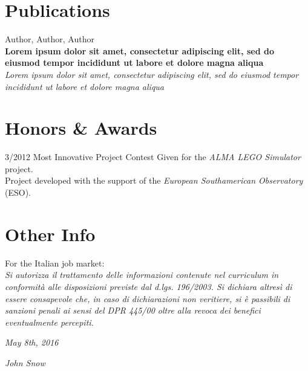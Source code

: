 \documentclass[]{friggeri-cv}
\begin{document}
\section{Publications}
Author, Author, Author\\
\textbf{Lorem ipsum dolor sit amet, consectetur adipiscing elit, sed do eiusmod tempor incididunt ut labore et dolore magna aliqua}\\
\emph{Lorem ipsum dolor sit amet, consectetur adipiscing elit, sed do eiusmod tempor incididunt ut labore et dolore magna aliqua}
\\
\section{Honors \& Awards}
\begin{entrylist}
  \entry
    {3/2012}
    {Most Innovative Project}
    {Contest}
    {Given for the \emph{ALMA LEGO Simulator} project.\\
    Project developed with the support of the \emph{European Southamerican Observatory} (ESO).}
\end{entrylist}

\section{Other Info}
For the Italian job market:\\
\emph{Si autorizza il trattamento delle informazioni contenute nel curriculum in conformità alle disposizioni previste dal d.lgs. 196/2003. Si dichiara altresì di essere consapevole che, in caso di dichiarazioni non veritiere, si è passibili di sanzioni penali ai sensi del DPR 445/00 oltre alla revoca dei benefici eventualmente percepiti.}
\\
\begin{flushleft}
\emph{May 8th, 2016}
\end{flushleft}
\begin{flushright}
\emph{John Snow}
\end{flushright}
\end{document}
